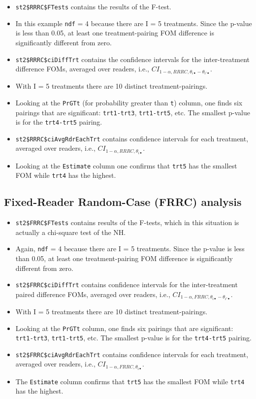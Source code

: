 \documentclass[
]{book}
\begin{document}
\begin{itemize}
\item
  \texttt{st2\$RRRC\$FTests} contains the results of the F-test.
\item
  In this example \texttt{ndf} = 4 because there are I = 5 treatments. Since the p-value is less than 0.05, at least one treatment-pairing FOM difference is significantly different from zero.
\item
  \texttt{st2\$RRRC\$ciDiffTrt} contains the confidence intervals for the inter-treatment difference FOMs, averaged over readers, i.e., \(CI_{1-\alpha,RRRC,\theta_{i \bullet} - \theta_{i' \bullet}}\).
\item
  With I = 5 treatments there are 10 distinct treatment-pairings.
\item
  Looking at the \texttt{PrGTt} (for probability greater than \texttt{t}) column, one finds six pairings that are significant: \texttt{trt1-trt3}, \texttt{trt1-trt5}, etc. The smallest p-value is for the \texttt{trt4-trt5} pairing.
\item
  \texttt{st2\$RRRC\$ciAvgRdrEachTrt} contains confidence intervals for each treatment, averaged over readers, i.e., \(CI_{1-\alpha,RRRC,\theta_{i \bullet}}\).
\item
  Looking at the \texttt{Estimate} column one confirms that \texttt{trt5} has the smallest FOM while \texttt{trt4} has the highest.
\end{itemize}

\hypertarget{ORApplications-FRRC-dataset04}{%
\subsection{Fixed-Reader Random-Case (FRRC) analysis}\label{ORApplications-FRRC-dataset04}}

\begin{itemize}
\item
  \texttt{st2\$FRRC\$FTests} contains results of the F-tests, which in this situation is actually a chi-square test of the NH.
\item
  Again, \texttt{ndf} = 4 because there are I = 5 treatments. Since the p-value is less than 0.05, at least one treatment-pairing FOM difference is significantly different from zero.
\item
  \texttt{st2\$FRRC\$ciDiffTrt} contains confidence intervals for the inter-treatment paired difference FOMs, averaged over readers, i.e., \(CI_{1-\alpha,FRRC,\theta_{i \bullet} - \theta_{i' \bullet}}\).
\item
  With I = 5 treatments there are 10 distinct treatment-pairings.
\item
  Looking at the \texttt{PrGTt} column, one finds six pairings that are significant: \texttt{trt1-trt3}, \texttt{trt1-trt5}, etc. The smallest p-value is for the \texttt{trt4-trt5} pairing.
\item
  \texttt{st2\$FRRC\$ciAvgRdrEachTrt} contains confidence intervals for each treatment, averaged over readers, i.e., \(CI_{1-\alpha,FRRC,\theta_{i \bullet}}\).
\item
  The \texttt{Estimate} column confirms that \texttt{trt5} has the smallest FOM while \texttt{trt4} has the highest.
\end{itemize}
\end{document}
